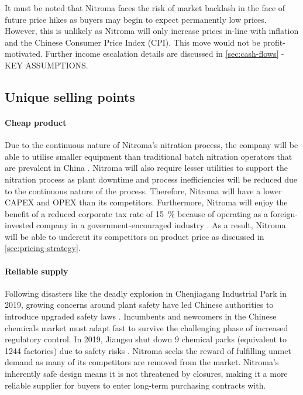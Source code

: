 It must be noted that Nitroma faces the risk of market backlash in the face of future price hikes as buyers may begin to expect permanently low prices. However, this is unlikely as Nitroma will only increase prices in-line with inflation and the Chinese Consumer Price Index (CPI). This move would not be profit-motivated. Further income escalation details are discussed in \cref{sec:cash-flows} - KEY ASSUMPTIONS.

\subsection{Unique selling points}
\label{sec:USP}
\paragraph{Cheap product}
Due to the continuous nature of Nitroma’s nitration process, the company will be able to utilise smaller equipment than traditional batch nitration operators that are prevalent in China \cite{lee_mordernizing_2015}. Nitroma will also require lesser utilities to support the nitration process as plant downtime and process inefficiencies will be reduced due to the continuous nature of the process. Therefore, Nitroma will have a lower CAPEX and OPEX than its competitors. Furthermore, Nitroma will enjoy the benefit of a reduced corporate tax rate of \SI{15}{\percent} because of operating as a foreign-invested company in a government-encouraged industry \cite{ministry_of_commerce_china_catalouge_2020}. As a result, Nitroma will be able to undercut its competitors on product price as discussed in \cref{sec:pricing-strategy}.

\paragraph{Reliable supply}
Following disasters like the deadly explosion in Chenjiagang Industrial Park in 2019, growing concerns around plant safety have led Chinese authorities to introduce upgraded safety laws \cite{naidu_china_2019}. Incumbents and newcomers in the Chinese chemicals market must adapt fast to survive the challenging phase of increased regulatory control. In 2019, Jiangsu shut down 9 chemical parks (equivalent to 1244 factories) due to safety risks \cite{kielburger_chinese_2019}. Nitroma seeks the reward of fulfilling unmet demand as many of its competitors are removed from the market. Nitroma’s inherently safe design means it is not threatened by closures, making it a more reliable supplier for buyers to enter long-term purchasing contracts with.

